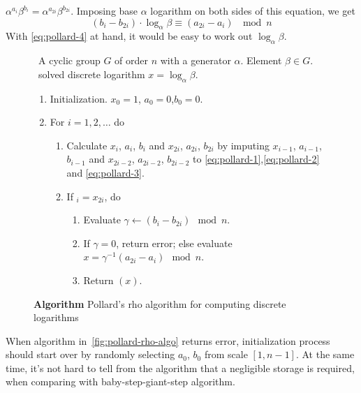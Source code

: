 \documentclass[12pt,journal,compsoc]{IEEEtran}
\begin{document}
$\alpha^{a_{i}}\beta^{b_{i}}=\alpha^{a_{2i}}\beta^{b_{2i}}$. Imposing
base $\alpha$ logarithm on both sides of this equation, we get
\begin{equation}
  \label{eq:pollard-4}
  (b_{i}-b_{2i})\cdot\log_{\alpha}\beta\equiv(a_{2i}-a_{i})~\mod n
\end{equation}
With \autoref{eq:pollard-4} at hand, it would be easy to work
out $\log_{\alpha}\beta$. 
\begin{figure}[!htbp]
  \centering
  \begin{algorithmic}
    \REQUIRE~A cyclic group $G$ of order $n$ with a generator
    $\alpha$. Element $\beta\in G$.  
    \ENSURE~solved discrete logarithm $x=\log_{\alpha}\beta$.
    \begin{enumerate}
    \item Initialization. $x_{0}=1$, $a_{0}=0$,$b_{0}=0$.
    \item For $i=1,2,\ldots$ do
      \begin{enumerate}
      \item Calculate $x_{i}$, $a_{i}$, $b_{i}$ and $x_{2i}$,
        $a_{2i}$, $b_{2i}$ by imputing $x_{i-1}$, $a_{i-1}$, $b_{i-1}$
        and  $x_{2i-2}$, $a_{2i-2}$, $b_{2i-2}$ to
        \autoref{eq:pollard-1},\autoref{eq:pollard-2} and
        \autoref{eq:pollard-3}. 
      \item If $_{i}=x_{2i}$, do
        \begin{enumerate}
        \item Evaluate $\gamma\leftarrow(b_{i}-b_{2i})\mod n$.
        \item If $\gamma=0$, return error; else evaluate
          $x=\gamma^{-1}(a_{2i}-a_{i})\mod n$. 
        \item Return $(x)$.
        \end{enumerate}
      \end{enumerate}
    \end{enumerate}
  \end{algorithmic}
  \caption{\textbf{Algorithm} Pollard's rho algorithm for computing discrete logarithms}
  \label{fig:pollard-rho-algo}
\end{figure}
\par
When algorithm in~\autoref{fig:pollard-rho-algo} returns error,
initialization process should start over by randomly selecting
$a_{0}$, $b_{0}$ from scale $[1,n-1]$. At the same time, it's not hard
to tell from the algorithm that a negligible storage is required, when
comparing with baby-step-giant-step algorithm.
\end{document}

